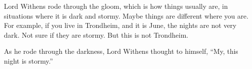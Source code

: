 \documentclass{novelette}
\begin{document}
\begin{opening}
\null\null\null
{}
\end{opening}
 Lord Withens rode through the gloom,
which is how things usually are, in situations where it is dark and stormy.
Maybe things are different where you are. For example, if you live in
Trondheim, and it is June, the nights are not very dark. Not sure if they
are stormy. But this is not Trondheim.

As he rode through the darkness, Lord Withens thought to himself,
``My, this night is stormy.''
\end{document}
